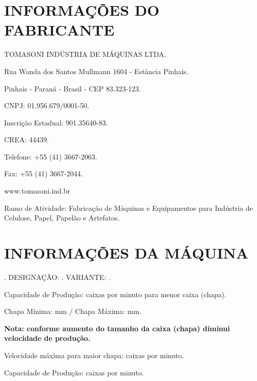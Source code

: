 \thispagestyle{fancy}

\vspace*{40 pt}

\section{\large{INFORMAÇÕES DO FABRICANTE}}

TOMASONI INDÚSTRIA DE MÁQUINAS LTDA.

Rua Wanda dos Santos Mullmann 1604 - Estância Pinhais.

Pinhais - Paraná - Brasil - CEP 83.323-123.

CNPJ: 01.956.679/0001-50.

Inscrição Estadual: 901.35640-83.

CREA: 44439.

Telefone: +55 (41) 3667-2063.

Fax: +55 (41) 3667-2044.

www.tomasoni.ind.br

Ramo de Atividade: Fabricação de Máquinas e Equipamentos para Indústria de Celulose, Papel, Papelão e Artefatos.

\section{\large{INFORMAÇÕES DA MÁQUINA}}

\machineName \space. DESIGNAÇÃO: \machineShortName. VARIANTE: \variant.

\ifmachineTypeFlexo

Capacidade de Produção: \productionCapacityminimumSheet \space caixas por minuto para menor caixa (chapa).

Chapa Mínima: \minimumSheet \space mm / Chapa Máxima: \maximumSheet \space mm.

\textbf{Nota: conforme aumento do tamanho da caixa (chapa) diminui velocidade de produção.}

\ifmachineTypeMiniline \else

Velocidade máxima para maior chapa: \productionCapacitymaximumSheet \space caixas por minuto.

\fi
\fi
\ifmachineTypeIcv

Capacidade de Produção: \productionCapacityminimumSheet \space caixas por minuto.

\fi


